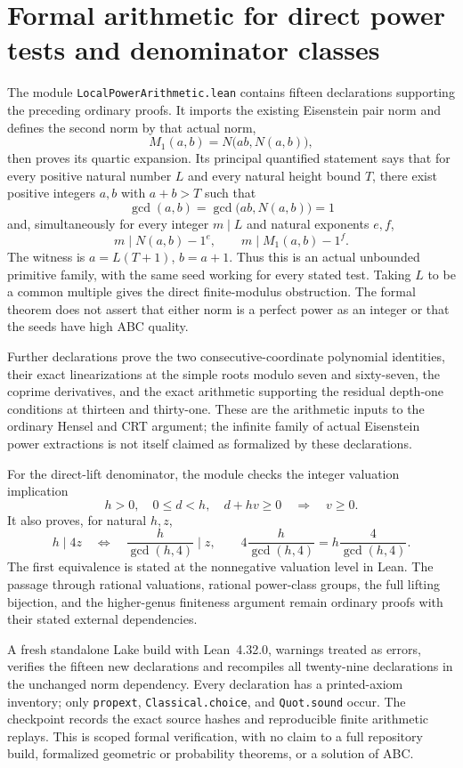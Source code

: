 \section{Formal arithmetic for direct power tests and denominator classes}
\label{sec:formal-support-power}

The module \texttt{LocalPowerArithmetic.lean} contains fifteen declarations
supporting the preceding ordinary proofs. It imports the existing
Eisenstein pair norm and defines the second norm by that actual norm,
\[
 M_1(a,b)=N\bigl(ab,N(a,b)\bigr),
\]
then proves its quartic expansion. Its principal quantified statement says
that for every positive natural number $L$ and every natural height bound
$T$, there exist positive integers $a,b$ with $a+b>T$ such that
\[
 \gcd(a,b)=\gcd\bigl(ab,N(a,b)\bigr)=1
\]
and, simultaneously for every integer $m\mid L$ and natural exponents
$e,f$,
\[
 m\mid N(a,b)-1^e,\qquad m\mid M_1(a,b)-1^f.
\]
The witness is $a=L(T+1)$, $b=a+1$. Thus this is an actual unbounded
primitive family, with the same seed working for every stated test.
Taking $L$ to be a common multiple gives the direct finite-modulus
obstruction. The formal theorem does not assert that either norm is a
perfect power as an integer or that the seeds have high ABC quality.

Further declarations prove the two consecutive-coordinate polynomial
identities, their exact linearizations at the simple roots modulo seven
and sixty-seven, the coprime derivatives, and the exact arithmetic
supporting the residual depth-one conditions at thirteen and thirty-one.
These are the arithmetic inputs to the ordinary Hensel and CRT argument;
the infinite family of actual Eisenstein power extractions is not itself
claimed as formalized by these declarations.

For the direct-lift denominator, the module checks the integer valuation
implication
\[
 h>0,\quad 0\le d<h,\quad d+hv\ge0
 \quad\Longrightarrow\quad v\ge0.
\]
It also proves, for natural $h,z$,
\[
 h\mid4z\quad\Longleftrightarrow\quad
 \frac{h}{\gcd(h,4)}\mid z,
 \qquad
 4\frac{h}{\gcd(h,4)}=h\frac4{\gcd(h,4)}.
\]
The first equivalence is stated at the nonnegative valuation level in
Lean. The passage through rational valuations, rational power-class
groups, the full lifting bijection, and the higher-genus finiteness
argument remain ordinary proofs with their stated external dependencies.

A fresh standalone Lake build with Lean~4.32.0, warnings treated as
errors, verifies the fifteen new declarations and recompiles all
twenty-nine declarations in the unchanged norm dependency. Every
declaration has a printed-axiom inventory; only \texttt{propext},
\texttt{Classical.choice}, and \texttt{Quot.sound} occur. The checkpoint
records the exact source hashes and reproducible finite arithmetic
replays. This is scoped formal verification, with no claim to a full
repository build, formalized geometric or probability theorems, or a
solution of ABC.
